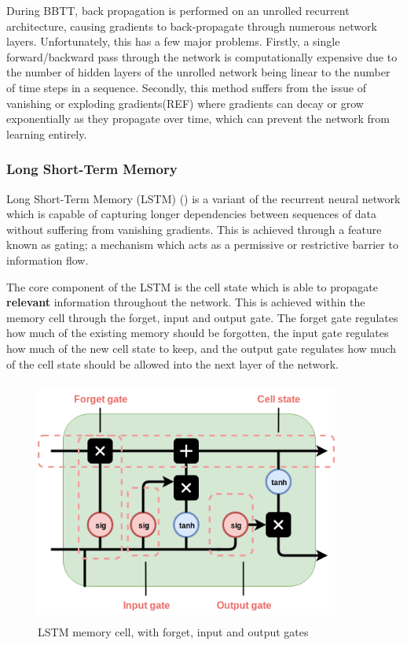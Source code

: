\par
\noindent
\newline
During BBTT, back propagation is performed on an unrolled recurrent architecture, causing gradients to back-propagate through numerous network layers. Unfortunately, this has a few major problems. Firstly, a single forward/backward pass through the network is computationally expensive due to the number of hidden layers of the unrolled network being linear to the number of time steps in a sequence. Secondly, this method suffers from the issue of vanishing or exploding gradients(REF) where gradients can decay or grow exponentially as they propagate over time, which can prevent the network from learning entirely.

\subsubsection{Long Short-Term Memory}
Long Short-Term Memory (LSTM) (\cite{Hochreiter1997}) is a variant of the recurrent neural network which is capable of capturing longer dependencies between sequences of data without suffering from vanishing gradients. This is achieved through a feature known as gating; a mechanism which acts as a permissive or restrictive barrier to information flow. 

\noindent
\newline
The core component of the LSTM is the cell state which is able to propagate \textbf{relevant} information throughout the network. This is achieved within the memory cell through the forget, input and output gate. The forget gate regulates how much of the existing memory should be forgotten, the input gate regulates how much of the new cell state to keep, and the output gate regulates how much of the cell state should be allowed into the next layer of the network.

\begin{figure}[h]
	\includegraphics[width=10cm, height=8cm]{./figures/fig4}
	\centering
	\caption{LSTM memory cell, with forget, input and output gates}
	\label{fig:fig4}
\end{figure}

